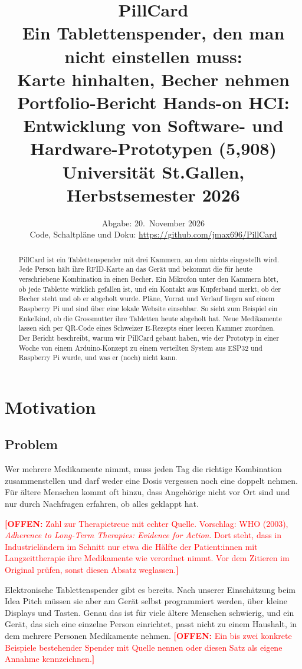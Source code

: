 \documentclass[11pt,a4paper]{article}
\title{%
  \textbf{PillCard}\\[0.4em]
  \large Ein Tablettenspender, den man nicht einstellen muss:\\
  Karte hinhalten, Becher nehmen\\[1em]
  \normalsize Portfolio-Bericht \textperiodcentered{} Hands-on HCI: Entwicklung von Software- und Hardware-Prototypen (5,908)\\
  Universität St.Gallen, Herbstsemester 2026}
\author{\maxname \and \stasianame \and \krisname}
\date{Abgabe: 20.~November 2026\\[0.5em]
  \small Code, Schaltpläne und Doku: \url{https://github.com/jmax696/PillCard}}
\newcommand{\offen}[1]{\textcolor{red}{\textbf{[OFFEN:} #1\textbf{]}}}
\begin{document}
\maketitle
\thispagestyle{empty}

\begin{abstract}
\noindent
PillCard ist ein Tablettenspender mit drei Kammern, an dem nichts eingestellt wird. Jede Person hält
ihre RFID-Karte an das Gerät und bekommt die für heute verschriebene Kombination in einen Becher.
Ein Mikrofon unter den Kammern hört, ob jede Tablette wirklich gefallen ist, und ein Kontakt aus
Kupferband merkt, ob der Becher steht und ob er abgeholt wurde. Pläne, Vorrat und Verlauf liegen auf
einem Raspberry Pi und sind über eine lokale Website einsehbar. So sieht zum Beispiel ein Enkelkind,
ob die Grossmutter ihre Tabletten heute abgeholt hat. Neue Medikamente lassen sich per QR-Code eines
Schweizer E-Rezepts einer leeren Kammer zuordnen. Der Bericht beschreibt, warum wir PillCard gebaut
haben, wie der Prototyp in einer Woche von einem Arduino-Konzept zu einem verteilten System aus
ESP32 und Raspberry Pi wurde, und was er (noch) nicht kann.
\end{abstract}

\tableofcontents
\newpage

\section{Motivation}
\label{sec:motivation}

\subsection{Problem}

Wer mehrere Medikamente nimmt, muss jeden Tag die richtige Kombination zusammenstellen und darf
weder eine Dosis vergessen noch eine doppelt nehmen. Für ältere Menschen kommt oft hinzu, dass
Angehörige nicht vor Ort sind und nur durch Nachfragen erfahren, ob alles geklappt hat.

\offen{Zahl zur Therapietreue mit echter Quelle. Vorschlag: WHO (2003), \emph{Adherence to
Long-Term Therapies: Evidence for Action}. Dort steht, dass in Industrieländern im Schnitt nur etwa
die Hälfte der Patient:innen mit Langzeittherapie ihre Medikamente wie verordnet nimmt. Vor dem
Zitieren im Original prüfen, sonst diesen Absatz weglassen.}

Elektronische Tablettenspender gibt es bereits. Nach unserer Einschätzung beim Idea Pitch müssen sie
aber am Gerät selbst programmiert werden, über kleine Displays und Tasten. Genau das ist für viele
ältere Menschen schwierig, und ein Gerät, das sich eine einzelne Person einrichtet, passt nicht zu
einem Haushalt, in dem mehrere Personen Medikamente nehmen.
\offen{Ein bis zwei konkrete Beispiele bestehender Spender mit Quelle nennen oder diesen Satz als
eigene Annahme kennzeichnen.}
\end{document}
